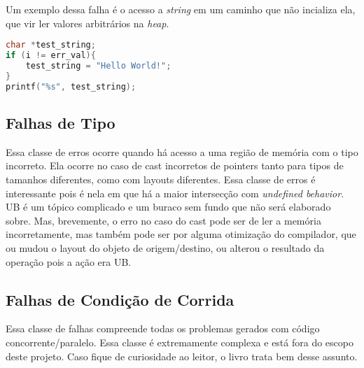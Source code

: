 Um exemplo dessa falha é o acesso a \emph{string} em um caminho que não incializa ela, que vir ler valores arbitrários na \emph{heap}.

\begin{lstlisting}[language=C, label={lst:initialization}, caption=Exemplo de uma Falha de Inicalização com Strings]
char *test_string;
if (i != err_val){
	test_string = "Hello World!";
}
printf("%s", test_string);
\end{lstlisting}


\subsection{Falhas de Tipo}

Essa classe de erros ocorre quando há acesso a uma região de memória com o tipo incorreto. Ela ocorre no caso de cast incorretos de pointers tanto para tipos de tamanhos diferentes, como com layouts diferentes. Essa classe de erros é interessante pois é nela em que há a maior intersecção com \emph{undefined behavior}. UB é um tópico complicado e um buraco sem fundo que não será elaborado sobre. Mas, brevemente, o erro no caso do cast pode ser de ler a memória incorretamente, mas também pode ser por alguma otimização do compilador, que ou mudou o layout do objeto de origem/destino, ou alterou o resultado da operação pois a ação era UB.

\subsection{Falhas de Condição de Corrida}

Essa classe de falhas compreende todas os problemas gerados com código concorrente/paralelo. Essa classe é extremamente complexa e está fora do escopo deste projeto. Caso fique de curiosidade ao leitor, o livro  trata bem desse assunto. 
